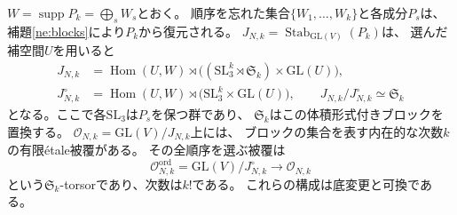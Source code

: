 \begin{lemma}[安定化群と順序付きブロック被覆]
\label{lem:pg-intrinsic-block-cover}
$W=\operatorname{supp}P_k=\bigoplus_sW_s$とおく。
順序を忘れた集合$\{W_1,\ldots,W_k\}$と各成分$P_s$は、
補題\ref{ne:blocks}により$P_k$から復元される。
$J_{N,k}=\operatorname{Stab}_{\mathrm{GL}(V)}(P_k)$は、
選んだ補空間$U$を用いると
\begin{equation}
 \begin{aligned}
 J_{N,k}
  &=\operatorname{Hom}(U,W)\rtimes
     \bigl((\mathrm{SL}_3^k\rtimes\mathfrak S_k)
                   \times\mathrm{GL}(U)\bigr),\\
 J_{N,k}^{\circ}
  &=\operatorname{Hom}(U,W)\rtimes
     \bigl(\mathrm{SL}_3^k\times\mathrm{GL}(U)\bigr),
 \qquad J_{N,k}/J_{N,k}^{\circ}\simeq\mathfrak S_k
 \end{aligned}
 \label{eq:pg-intrinsic-multiblock-stabilizer}
\end{equation}
となる。ここで各$\mathrm{SL}_3$は$P_s$を保つ群であり、
$\mathfrak S_k$はこの体積形式付きブロックを置換する。
$\mathcal O_{N,k}=\mathrm{GL}(V)/J_{N,k}$上には、
ブロックの集合を表す内在的な次数$k$の有限\'etale被覆がある。
その全順序を選ぶ被覆は
\begin{equation}
 \mathcal O_{N,k}^{\mathrm{ord}}
   =\mathrm{GL}(V)/J_{N,k}^{\circ}
   \longrightarrow\mathcal O_{N,k}
 \label{eq:pg-intrinsic-ordered-block-cover}
\end{equation}
という$\mathfrak S_k$-torsorであり、次数は$k!$である。
これらの構成は底変更と可換である。
\end{lemma}
